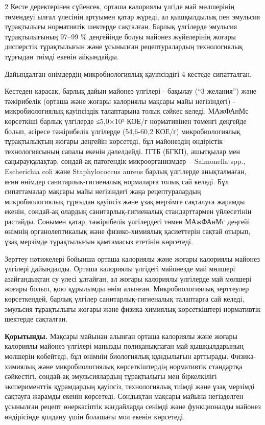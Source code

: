 \begin{multicols}{2}
Кесте деректерінен сүйенсек, орташа калориялы үлгіде май мөлшерінің
төмендеуі ылғал үлесінің артуымен қатар жүреді, ал қышқылдылық пен
эмульсия тұрақтылығы нормативтік шектерде сақталған. Барлық үлгілерде
эмульсия тұрақтылығының 97--99 \% деңгейінде болуы майонез жүйелерінің
жоғары дисперстік тұрақтылығын және ұсынылған рецептуралардың
технологиялық тұрғыдан тиімді екенін айқындайды.

Дайындалған өнімдердің микробиологиялық қауіпсіздігі 4-кестеде
сипатталған.

Кестеден қарасақ, барлық дайын майонез үлгілері - бақылау (``3
желания'') және тәжірибелік (орташа және жоғары калориялы мақсары майы
негізіндегі) - микробиологиялық қауіпсіздік талаптарына толық сәйкес
келеді. МАжФАнМс көрсеткіші барлық үлгілерде ≤5,0×10³ КОЕ/г нормативінен
төменгі деңгейде болып, әсіресе тәжірибелік үлгілерде (54,6-60,2 КОЕ/г)
микробиологиялық тұрақтылықтың жоғары деңгейін көрсетеді, бұл майонездің
өндірістік технологиясының сапалы екенін дәлелдейді. ІТТБ (БГКП),
ашытқылар мен саңырауқұлақтар, сондай-ақ патогендік микроорганизмдер --
Salmonella spp., Escherichia coli және Staphylococcus aureus барлық
үлгілерде анықталмаған, яғни өнімдер санитарлық-гигиеналық нормаларға
толық сай келеді. Бұл сипаттамалар мақсары майы негізіндегі жаңа
рецептуралардың микробиологиялық тұрғыдан қауіпсіз және ұзақ мерзімге
сақталуға жарамды екенін, сондай-ақ олардың санитарлық-гигиеналық
стандарттармен үйлесетінін растайды. Сонымен қатар, тәжірибелік
үлгілердегі төмен МАжФАнМс деңгейі өнімнің органолептикалық және
физико-химиялық қасиеттерін сақтай отырып, ұзақ мерзімде тұрақтылығын
қамтамасыз ететінін көрсетеді.

Зерттеу нәтижелері бойынша орташа калориялы және жоғары калориялы
майонез үлгілері дайындалды. Орташа калориялы үлгідегі майонезде май
мөлшері азайғандықтан су үлесі ұлғайған, ал жоғары калориялы үлгілерде
май мөлшері жоғары болып, қою құрылымды өнім алынған. Микробиологиялық
зерттеулер көрсеткендей, барлық үлгілер санитарлық-гигиеналық талаптарға
сай келеді, эмульсия тұрақтылығы жоғары және физика-химиялық
көрсеткіштері нормативтік шектерде сақталған.

{\bfseries Қорытынды.} Мақсары майынан алынған орташа калориялы және жоғары
калориялы майонез үлгілері маңызды полиқанықпаған май қышқылдарының
мөлшерін көбейтеді, бұл өнімнің биологиялық құндылығын арттырады.
Физика-химиялық және микробиологиялық көрсеткіштердің нормативтік
стандартқа сәйкестігі, сондай-ақ эмульсиялардың тұрақтылығы мен
біркелкілігі эксперименттік құрамдардың қауіпсіз, технологиялық тиімді
және ұзақ мерзімді сақтауға жарамды екенін көрсетеді. Сондықтан мақсары
майына негізделген ұсынылған рецепт өнеркәсіптік жағдайларда сенімді
және функционалды майонез өндірісінде қолдану үшін болашағы мол екенін
көрсетеді.


\end{multicols}
